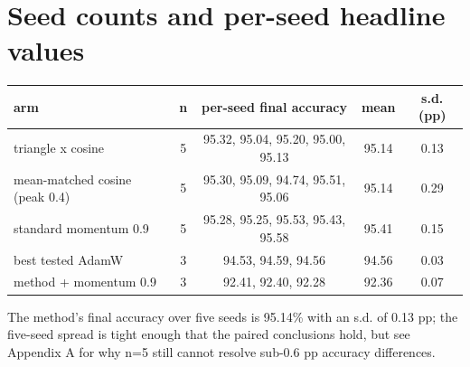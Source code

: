 \documentclass[11pt,a4paper]{article}
\begin{document}
\section{Seed counts and per-seed headline values}
\begin{center}
\small
\begin{tabular}{@{}lcccc@{}}
\toprule
\textbf{arm} & \textbf{n} & \textbf{per-seed final accuracy} & \textbf{mean} & \textbf{s.d. (pp)} \\
\midrule
triangle x cosine & 5 & 95.32, 95.04, 95.20, 95.00, 95.13 & 95.14 & 0.13 \\
mean-matched cosine (peak 0.4) & 5 & 95.30, 95.09, 94.74, 95.51, 95.06 & 95.14 & 0.29 \\
standard momentum 0.9 & 5 & 95.28, 95.25, 95.53, 95.43, 95.58 & 95.41 & 0.15 \\
best tested AdamW & 3 & 94.53, 94.59, 94.56 & 94.56 & 0.03 \\
method + momentum 0.9 & 3 & 92.41, 92.40, 92.28 & 92.36 & 0.07 \\
\bottomrule
\end{tabular}
\end{center}

The method's final accuracy over five seeds is 95.14\% with an s.d. of 0.13 pp; the five-seed spread is tight enough that the paired conclusions hold, but see Appendix A for why n=5 still cannot resolve sub-0.6 pp accuracy differences.
\end{document}
